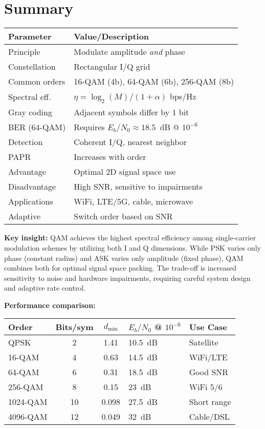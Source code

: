 \section{Summary}

\begin{center}
\begin{tabular}{@{}ll@{}}
\toprule
\textbf{Parameter} & \textbf{Value/Description} \\
\midrule
Principle & Modulate amplitude \emph{and} phase \\
Constellation & Rectangular I/Q grid \\
Common orders & 16-QAM (4b), 64-QAM (6b), 256-QAM (8b) \\
Spectral eff. & $\eta = \log_2(M)/(1+\alpha)$ bps/Hz \\
Gray coding & Adjacent symbols differ by 1 bit \\
BER (64-QAM) & Requires $E_b/N_0 \approx 18.5$~dB @ $10^{-6}$ \\
Detection & Coherent I/Q, nearest neighbor \\
PAPR & Increases with order \\
Advantage & Optimal 2D signal space use \\
Disadvantage & High SNR, sensitive to impairments \\
Applications & WiFi, LTE/5G, cable, microwave \\
Adaptive & Switch order based on SNR \\
\bottomrule
\end{tabular}
\end{center}

\textbf{Key insight:} QAM achieves the highest spectral efficiency among single-carrier modulation schemes by utilizing both I and Q dimensions. While PSK varies only phase (constant radius) and ASK varies only amplitude (fixed phase), QAM combines both for optimal signal space packing. The trade-off is increased sensitivity to noise and hardware impairments, requiring careful system design and adaptive rate control.

\textbf{Performance comparison:}

\begin{center}
\small
\begin{tabularx}{\textwidth}{@{}lccXX@{}}
\toprule
\textbf{Order} & \textbf{Bits/sym} & \textbf{$d_{\min}$} & \textbf{$E_b/N_0$ @ $10^{-6}$} & \textbf{Use Case} \\
\midrule
QPSK & 2 & 1.41 & 10.5~dB & Satellite \\
16-QAM & 4 & 0.63 & 14.5~dB & WiFi/LTE \\
64-QAM & 6 & 0.31 & 18.5~dB & Good SNR \\
256-QAM & 8 & 0.15 & 23~dB & WiFi 5/6 \\
1024-QAM & 10 & 0.098 & 27.5~dB & Short range \\
4096-QAM & 12 & 0.049 & 32~dB & Cable/DSL \\
\bottomrule
\end{tabularx}
\end{center}

